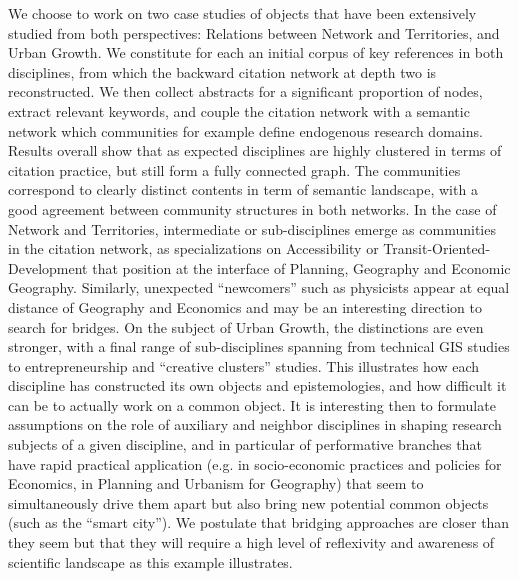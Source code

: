\documentclass[11pt]{article}
\begin{document}
 We choose to work on two case studies of objects that have been extensively studied from both perspectives: Relations between Network and Territories, and Urban Growth. We constitute for each an initial corpus of key references in both disciplines, from which the backward citation network at depth two is reconstructed. We then collect abstracts for a significant proportion of nodes, extract relevant keywords, and couple the citation network with a semantic network which communities for example define endogenous research domains. Results overall show that as expected disciplines are highly clustered in terms of citation practice, but still form a fully connected graph. The communities correspond to clearly distinct contents in term of semantic landscape, with a good agreement between community structures in both networks. In the case of Network and Territories, intermediate or sub-disciplines emerge as communities in the citation network, as specializations on Accessibility or Transit-Oriented-Development that position at the interface of Planning, Geography and Economic Geography. Similarly, unexpected ``newcomers'' such as physicists appear at equal distance of Geography and Economics and may be an interesting direction to search for bridges. On the subject of Urban Growth, the distinctions are even stronger, with a final range of sub-disciplines spanning from technical GIS studies to entrepreneurship and ``creative clusters'' studies. This illustrates how each discipline has constructed its own objects and epistemologies, and how difficult it can be to actually work on a common object. It is interesting then to formulate assumptions on the role of auxiliary and neighbor disciplines in shaping research subjects of a given discipline, and in particular of performative branches that have rapid practical application (e.g. in socio-economic practices and policies for Economics, in Planning and Urbanism for Geography) that seem to simultaneously drive them apart but also bring new potential common objects (such as the ``smart city''). We postulate that bridging approaches are closer than they seem but that they will require a high level of reflexivity and awareness of scientific landscape as this example illustrates.

















\end{document}
